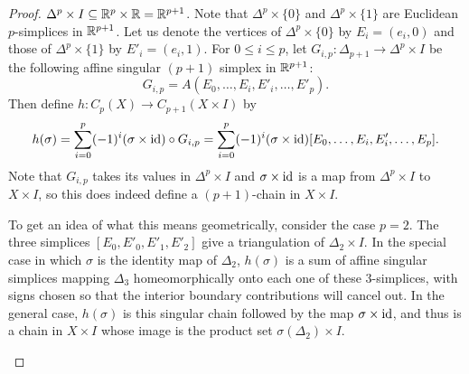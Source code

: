 \begin{proof}
$\Delta^p\times I\subseteq\mathbb{R}^p\times\mathbb{R}=\mathbb{R}^{p+1}$. Note that $\Delta^p\times\{0\}$ and $\Delta^p\times\{1\}$ are Euclidean $p$-simplices in $\mathbb{R}^{p+1}$. Let us denote the vertices of $\Delta^p\times\{0\}$ by $E_i=(e_i,0)$ and those of 
$\Delta^p\times\{1\}$ by $E'_i=(e_i,1)$. For $0\leq i\leq p$, let $G_{i,p}:\Delta_{p+1}\to\Delta^p\times I$ be the following affine singular $(p+1)$ simplex in $\mathbb{R}^{p+1}$:
\[G_{i,p}=A(E_0,\dots,E_i,E'_i,\dots,E'_p).\]
Then define $h:C_p(X)\to C_{p+1}(X\times I)$ by
\[h(\sigma)=\sum_{i=0}^{p}(-1)^i(\sigma\times\mathrm{id})\circ G_{i,p}=\sum_{i=0}^{p}(-1)^i(\sigma\times\mathrm{id})[E_0,\dots,E_i,E'_i,\dots,E_p].\]
Note that $G_{i,p}$ takes its values in $\Delta^p\times I$ and $\sigma\times\mathrm{id}$ is a map from $\Delta^p\times I$ to $X\times I$,
so this does indeed define a $(p+1)$-chain in $X\times I$.\par
To get an idea of what this means geometrically, consider the case $p=2$. The three simplices $[E_0,E'_0,E'_1,E'_2]$ give a triangulation of $\Delta_2\times I$. In the 
special case in which $\sigma$ is the identity map of $\Delta_2$, $h(\sigma)$ is a sum of affine singular simplices mapping $\Delta_3$ homeomorphically onto each one 
of these $3$-simplices, with signs chosen so that the interior boundary contributions will cancel out. In the general case, $h(\sigma)$ is this singular chain 
followed by the map $\sigma\times\mathrm{id}$, and thus is a chain in $X\times I$ whose image is the product set $\sigma(\Delta_2)\times I$.
\begin{figure}[htbp]
\centering

\end{figure}
\end{proof}
